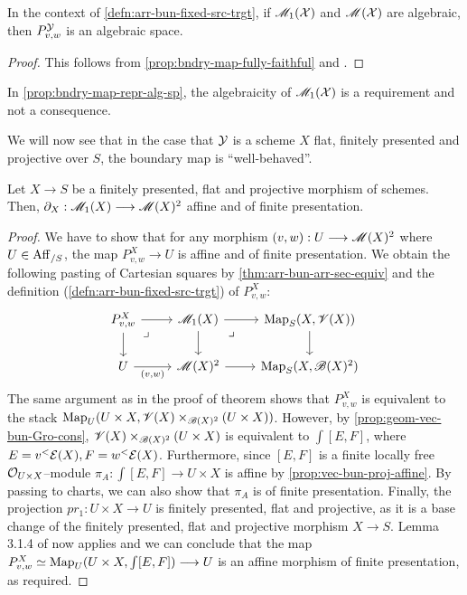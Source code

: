 \documentclass[11pt]{amsart}
\begin{document}
\begin{prop}\label{prop:bndry-map-repr-alg-sp}
In the context of \cref{defn:arr-bun-fixed-src-trgt}, if
$\mathscr{M}_1(\mathcal{X})$ and $\mathscr{M}(\mathcal{X})$ are algebraic, then $P^\mathcal{Y}_{v, w}$
is an algebraic space.
\end{prop}
\begin{proof}
This follows from \cref{prop:bndry-map-fully-faithful} and
\cite[\href{https://stacks.math.columbia.edu/tag/04Y5}{Lemma 04Y5}]
{stacks-project}.
\end{proof}

\begin{warn}
In \cref{prop:bndry-map-repr-alg-sp}, the algebraicity of $\mathscr{M}_1(\mathcal{X})$
is a requirement and not a consequence.
\end{warn}

We will now see that in the case that $\mathcal{Y}$ is a scheme $X$ flat, finitely
presented and projective over $S$, the boundary map is ``well-behaved''.

\begin{thm}\label{thm:X-fppf-proj-bndry-map-aff-fp}
Let $X \to S$ be a finitely presented, flat and projective morphism of schemes.
Then, $\partial_X : \sM_1(X) \to \sM(X)^2$ affine and of finite presentation.
\end{thm}
\begin{proof}
We have to show that for any morphism $(v, w) : U \to \sM(X)^2$ where
$U \in \mathrm{Aff}_{/S}$, the map $P^X_{v, w} \to U$ is affine and of finite
presentation.
We obtain the following pasting of Cartesian squares by
\cref{thm:arr-bun-arr-sec-equiv} and the definition
(\ref{defn:arr-bun-fixed-src-trgt}) of $P^X_{v, w}$:
\[\begin{tikzcd}
P^X_{v, w} \ar[r] \ar[d] \ar[rd, phantom, "\lrcorner" very near start] &
\sM_1(X) \ar[r] \ar[d] \ar[rd, phantom, "\lrcorner" very near start] &
\Map_S(X, \sV(X)) \ar[d] \\
U \ar[r, "{(v, w)}" below] &
\sM(X)^2 \ar[r] &
\Map_S(X, \sB(X)^2)
\end{tikzcd}\]
The same argument as in the proof of theorem \cite[Lemma 3.2.1]{Wang-BunG}
shows that $P^X_{v, w}$ is equivalent to the stack
$\mathrm{Map}_U(U \times X, \mathscr{V}(X) \times_{\mathscr{B}(X)^2} (U \times X))$. However,
by \cref{prop:geom-vec-bun-Gro-cons}, $\mathscr{V}(X) \times_{\mathscr{B}(X)^2} (U \times X)$
is equivalent to $\int [E, F]$, where $E = v^<\mathcal{E}(X), F = w^<\mathcal{E}(X)$.
Furthermore, since $[E, F]$ is a finite locally free $\mathcal{O}_{U \times X}$--module
$\pi_A : \int [E, F] \to U \times X$ is affine by
\cref{prop:vec-bun-proj-affine}. By passing to charts, we can also show that
$\pi_A$ is of finite presentation. Finally, the projection
$pr_1 : U \times X \to U$ is finitely presented, flat and projective,
as it is a base change of the finitely presented, flat and projective morphism
$X \to S$. Lemma 3.1.4 of \cite{Wang-BunG} now applies and we can conclude that
the map $P^X_{v, w} \simeq \Map_U(U \times X, \int [E, F]) \to U$ is an affine
morphism of finite presentation, as required.
\end{proof}
\end{document}
